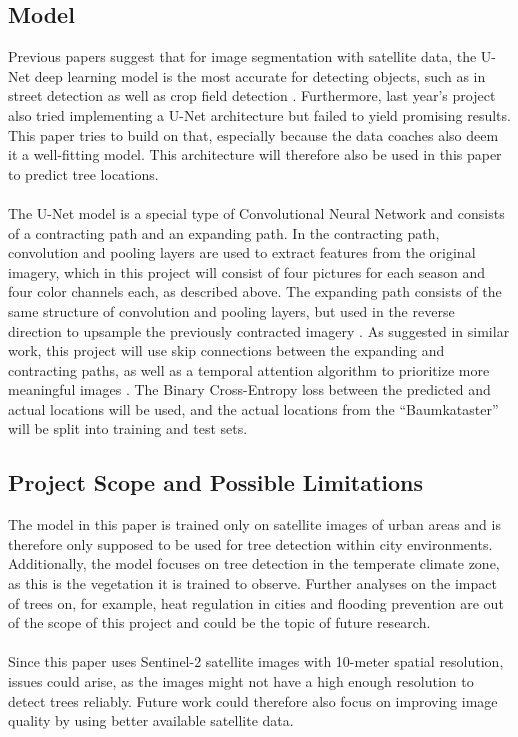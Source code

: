 \documentclass[12pt]{article}
\begin{document}
\subsection{Model}

Previous papers suggest that for image segmentation with satellite data, the U-Net deep learning model is the most accurate for detecting objects, such as in street detection \cite{pesek2024convolution} as well as crop field detection \cite{garnot2021panoptic}. Furthermore, last year's project also tried implementing a U-Net architecture but failed to yield promising results. This paper tries to build on that, especially because the data coaches also deem it a well-fitting model. This architecture will therefore also be used in this paper to predict tree locations. \\
\\
The U-Net model is a special type of Convolutional Neural Network and consists of a contracting path and an expanding path. In the contracting path, convolution and pooling layers are used to extract features from the original imagery, which in this project will consist of four pictures for each season and four color channels each, as described above. The expanding path consists of the same structure of convolution and pooling layers, but used in the reverse direction to upsample the previously contracted imagery \cite{aramendia2024}. As suggested in similar work, this project will use skip connections between the expanding and contracting paths, as well as a temporal attention algorithm to prioritize more meaningful images \cite{garnot2021panoptic}. The Binary Cross-Entropy loss between the predicted and actual locations will be used, and the actual locations from the ``Baumkataster'' will be split into training and test sets.

\subsection{Project Scope and Possible Limitations}

The model in this paper is trained only on satellite images of urban areas and is therefore only supposed to be used for tree detection within city environments. Additionally, the model focuses on tree detection in the temperate climate zone, as this is the vegetation it is trained to observe. Further analyses on the impact of trees on, for example, heat regulation in cities and flooding prevention are out of the scope of this project and could be the topic of future research. \\
\\
Since this paper uses Sentinel-2 satellite images with 10-meter spatial resolution, issues could arise, as the images might not have a high enough resolution to detect trees reliably. Future work could therefore also focus on improving image quality by using better available satellite data.
\end{document}
